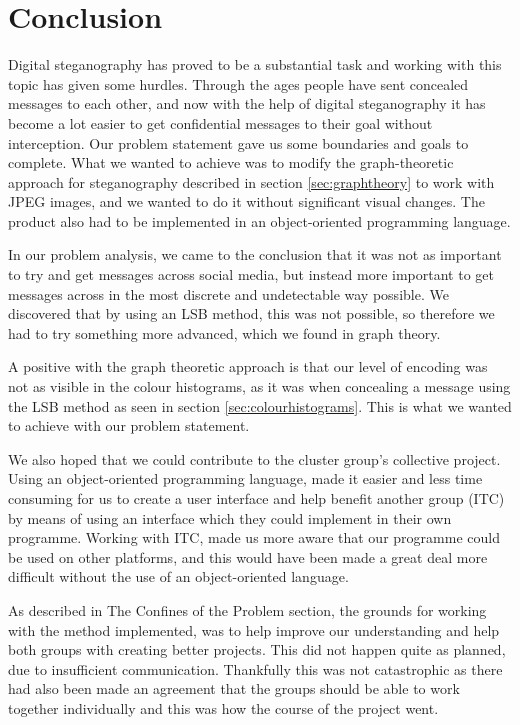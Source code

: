 \section{Conclusion}
Digital steganography has proved to be a substantial task and working with this topic has given some hurdles. 
Through the ages people have sent concealed messages to each other, and now with the help of digital steganography it has become a lot easier to get confidential messages to their goal without interception.
Our problem statement gave us some boundaries and goals to complete. What we wanted to achieve was to modify the graph-theoretic approach for steganography described in section \ref{sec:graphtheory} to work with JPEG images, and we wanted to do it without significant visual changes.
The product also had to be implemented in an object-oriented programming language.

In our problem analysis, we came to the conclusion that it was not as important to try and get messages across social media, but instead more important to get messages across in the most discrete and undetectable way possible. 
We discovered that by using an LSB method, this was not possible, so therefore we had to try something more advanced, which we found in graph theory.

A positive with the graph theoretic approach is that our level of encoding was not as visible in the colour histograms, as it was when concealing a message using the LSB method as seen in section \ref{sec:colourhistograms}. This is what we wanted to achieve with our problem statement.

We also hoped that we could contribute to the cluster group's collective project.
Using an object-oriented programming language, made it easier and less time consuming for us to create a user interface and help benefit another group (ITC) by means of using an interface which they could implement in their own programme. 
Working with ITC, made us more aware that our programme could be used on other platforms, and this would have been made a great deal more difficult without the use of an object-oriented language.

As described in The Confines of the Problem section, the grounds for working with the method implemented, was to help improve our understanding and help both groups with creating better projects. 
This did not happen quite as planned, due to insufficient communication. Thankfully this was not catastrophic as there had also been made an agreement that the groups should be able to work together individually and this was how the course of the project went.

